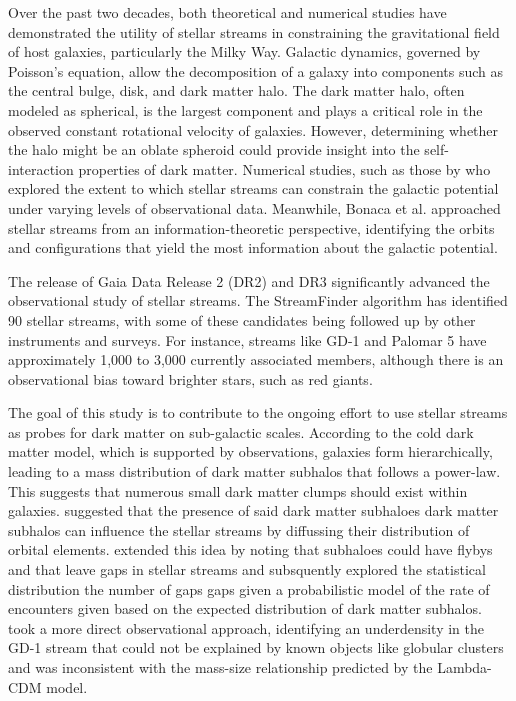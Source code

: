 \documentclass[draft]{aa}
\begin{document}
  Over the past two decades, both theoretical and numerical studies have demonstrated the utility of stellar streams in constraining the gravitational field of host galaxies, particularly the Milky Way. Galactic dynamics, governed by Poisson's equation, allow the decomposition of a galaxy into components such as the central bulge, disk, and dark matter halo. The dark matter halo, often modeled as spherical, is the largest component and plays a critical role in the observed constant rotational velocity of galaxies. However, determining whether the halo might be an oblate spheroid could provide insight into the self-interaction properties of dark matter. Numerical studies, such as those by \citet{varghese2011stellar} who explored the extent to which stellar streams can constrain the galactic potential under varying levels of observational data. Meanwhile, Bonaca et al. approached stellar streams from an information-theoretic perspective, identifying the orbits and configurations that yield the most information about the galactic potential.

  The release of Gaia Data Release 2 (DR2) and DR3 significantly advanced the observational study of stellar streams. The StreamFinder algorithm has identified 90 stellar streams, with some of these candidates being followed up by other instruments and surveys. For instance, streams like GD-1 and Palomar 5 have approximately 1,000 to 3,000 currently associated members, although there is an observational bias toward brighter stars, such as red giants.

  The goal of this study is to contribute to the ongoing effort to use stellar streams as probes for dark matter on sub-galactic scales. According to the cold dark matter model, which is supported by observations, galaxies form hierarchically, leading to a mass distribution of dark matter subhalos that follows a power-law. This suggests that numerous small dark matter clumps should exist within galaxies. \citet{rodrigo_ibata_uncovering_2002} suggested that the presence of said dark matter subhaloes dark matter subhalos can influence the stellar streams by diffussing their distribution of orbital elements. \citet{r_g_carlberg_pal_2012} extended this idea by noting that subhaloes could have flybys and that leave gaps in stellar streams and subsquently explored the statistical distribution the number of gaps gaps given a probabilistic model of the rate of encounters given based on the expected distribution of dark matter subhalos. \citet{bonaca_spur_2018} took a more direct observational approach, identifying an underdensity in the GD-1 stream that could not be explained by known objects like globular clusters and was inconsistent with the mass-size relationship predicted by the Lambda-CDM model.
\end{document}

